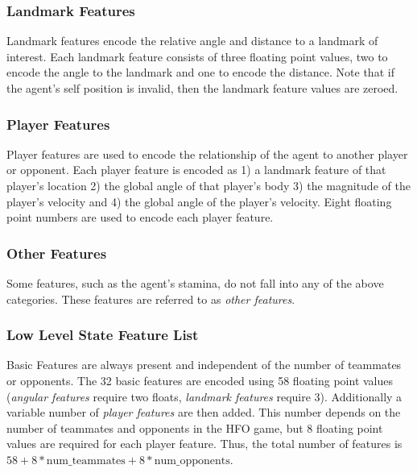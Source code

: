 \documentclass[12pt]{article}
\begin{document}
\subsubsection{Landmark Features}

Landmark features encode the relative angle and distance to a landmark
of interest. Each landmark feature consists of three floating point
values, two to encode the angle to the landmark and one to encode the
distance. Note that if the agent's self position is invalid, then the
landmark feature values are zeroed.

\subsubsection{Player Features}

Player features are used to encode the relationship of the agent to
another player or opponent. Each player feature is encoded as 1) a
landmark feature of that player's location 2) the global angle of that
player's body 3) the magnitude of the player's velocity and 4) the
global angle of the player's velocity. Eight floating point numbers
are used to encode each player feature.

\subsubsection{Other Features}

Some features, such as the agent's stamina, do not fall into any of
the above categories. These features are referred to as \textit{other
  features}.

\subsubsection{Low Level State Feature List}

Basic Features are always present and independent of the number of
teammates or opponents. The 32 basic features are encoded using 58
floating point values (\textit{angular features} require two floats,
\textit{landmark features} require 3). Additionally a variable number
of \textit{player features} are then added. This number depends on the
number of teammates and opponents in the HFO game, but 8 floating
point values are required for each player feature. Thus, the total
number of features is $58 + 8*\textrm{num\_teammates} +
8*\textrm{num\_opponents}$.
\end{document}
